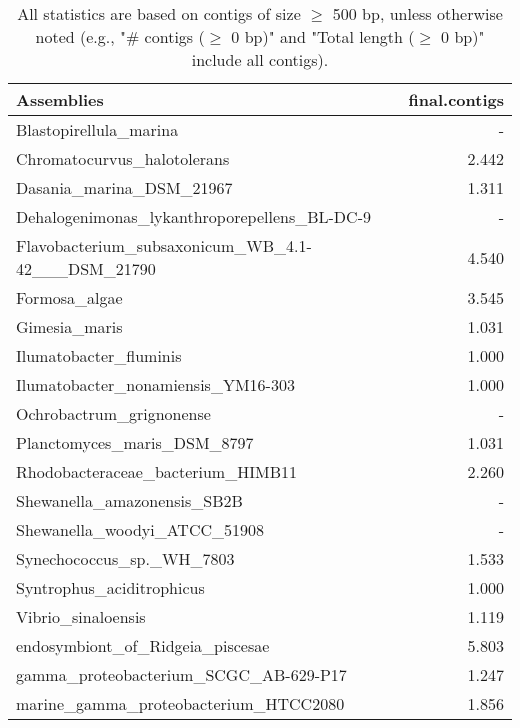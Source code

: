 \documentclass[12pt,a4paper]{article}
\begin{document}
\begin{table}[ht]
\begin{center}
\caption{All statistics are based on contigs of size $\geq$ 500 bp, unless otherwise noted (e.g., "\# contigs ($\geq$ 0 bp)" and "Total length ($\geq$ 0 bp)" include all contigs).}
\begin{tabular}{|l*{1}{|r}|}
\hline
Assemblies & final.contigs \\ \hline
Blastopirellula\_marina & - \\ \hline
Chromatocurvus\_halotolerans & 2.442 \\ \hline
Dasania\_marina\_DSM\_21967 & 1.311 \\ \hline
Dehalogenimonas\_lykanthroporepellens\_BL-DC-9 & - \\ \hline
Flavobacterium\_subsaxonicum\_WB\_4.1-42\_\_\_DSM\_21790 & 4.540 \\ \hline
Formosa\_algae & 3.545 \\ \hline
Gimesia\_maris & 1.031 \\ \hline
Ilumatobacter\_fluminis & 1.000 \\ \hline
Ilumatobacter\_nonamiensis\_YM16-303 & 1.000 \\ \hline
Ochrobactrum\_grignonense & - \\ \hline
Planctomyces\_maris\_DSM\_8797 & 1.031 \\ \hline
Rhodobacteraceae\_bacterium\_HIMB11 & 2.260 \\ \hline
Shewanella\_amazonensis\_SB2B & - \\ \hline
Shewanella\_woodyi\_ATCC\_51908 & - \\ \hline
Synechococcus\_sp.\_WH\_7803 & 1.533 \\ \hline
Syntrophus\_aciditrophicus & 1.000 \\ \hline
Vibrio\_sinaloensis & 1.119 \\ \hline
endosymbiont\_of\_Ridgeia\_piscesae & 5.803 \\ \hline
gamma\_proteobacterium\_SCGC\_AB-629-P17 & 1.247 \\ \hline
marine\_gamma\_proteobacterium\_HTCC2080 & 1.856 \\ \hline
\end{tabular}
\end{center}
\end{table}
\end{document}
